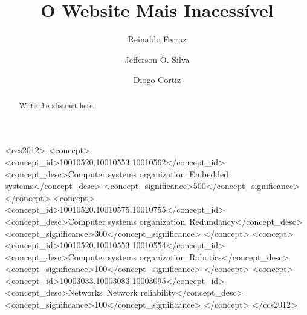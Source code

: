 \documentclass[sigconf]{acmart}
\begin{document}
\title{O Website Mais Inacessível}

\author{Reinaldo Ferraz}

\author{Jefferson O. Silva}

\author{Diogo Cortiz}



\renewcommand{\shortauthors}{Ferraz, et al.}

\begin{abstract}
  Write the abstract here.
\end{abstract}

\begin{CCSXML}
<ccs2012>
 <concept>
  <concept_id>10010520.10010553.10010562</concept_id>
  <concept_desc>Computer systems organization~Embedded systems</concept_desc>
  <concept_significance>500</concept_significance>
 </concept>
 <concept>
  <concept_id>10010520.10010575.10010755</concept_id>
  <concept_desc>Computer systems organization~Redundancy</concept_desc>
  <concept_significance>300</concept_significance>
 </concept>
 <concept>
  <concept_id>10010520.10010553.10010554</concept_id>
  <concept_desc>Computer systems organization~Robotics</concept_desc>
  <concept_significance>100</concept_significance>
 </concept>
 <concept>
  <concept_id>10003033.10003083.10003095</concept_id>
  <concept_desc>Networks~Network reliability</concept_desc>
  <concept_significance>100</concept_significance>
 </concept>
</ccs2012>
\end{CCSXML}
\end{document}
